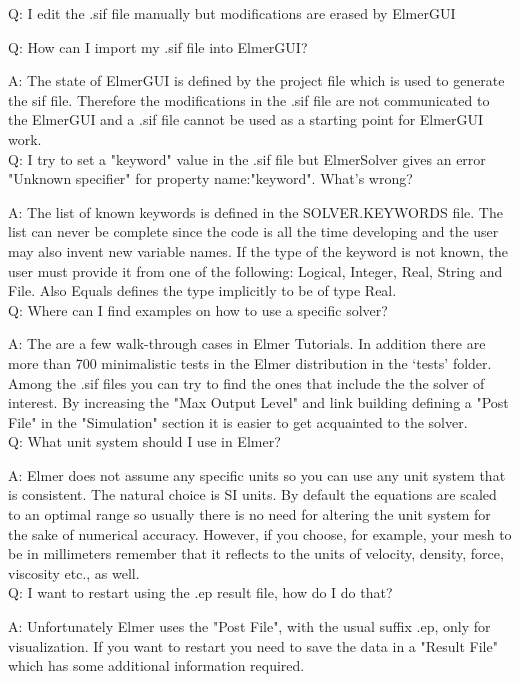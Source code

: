     Q: I edit the .sif file manually but modifications are erased by ElmerGUI

    Q: How can I import my .sif file into ElmerGUI?

    A: The state of ElmerGUI is defined by the project file which is used to generate the sif file. Therefore the modifications in the .sif file are not communicated to the ElmerGUI and a .sif file cannot be used as a starting point for ElmerGUI work.\\

    Q: I try to set a "keyword" value in the .sif file but ElmerSolver gives an error "Unknown specifier" for property name:"keyword". What's wrong?

    A: The list of known keywords is defined in the SOLVER.KEYWORDS file. The list can never be complete since the code is all the time developing and the user may also invent new variable names. If the type of the keyword is not known, the user must provide it from one of the following: Logical, Integer, Real, String and File. Also Equals defines the type implicitly to be of type Real.\\

    Q: Where can I find examples on how to use a specific solver?

    A: The are a few walk-through cases in Elmer Tutorials. In addition there are more than 700 minimalistic tests in the Elmer distribution in the `tests' folder.  Among the .sif files you can try to find the ones that include the the solver of interest. By increasing the "Max Output Level" and link building defining a "Post File" in the "Simulation" section it is easier to get acquainted to the solver.\\

    Q: What unit system should I use in Elmer?

    A: Elmer does not assume any specific units so you can use any unit system that is consistent. The natural choice is SI units. By default the equations are scaled to an optimal range so usually there is no need for altering the unit system for the sake of numerical accuracy. However, if you choose, for example, your mesh to be in millimeters remember that it reflects to the units of velocity, density, force, viscosity etc., as well.\\

    Q: I want to restart using the .ep result file, how do I do that?

    A: Unfortunately Elmer uses the "Post File", with the usual suffix .ep, only for visualization. If you want to restart you need to save the data in a "Result File" which has some additional information required.\\

